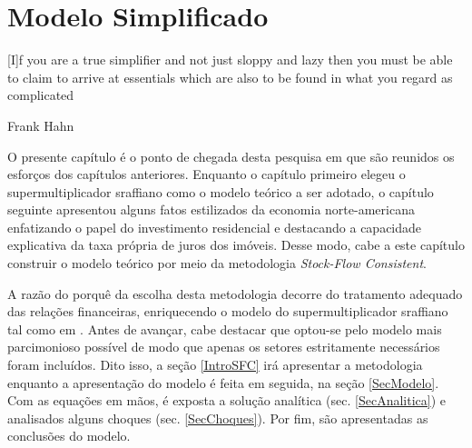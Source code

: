 
\chapter{Modelo Simplificado}\label{CapModelo}

\epigraph{[I]f you are a true simplifier and not just
sloppy and lazy then you must be able to claim to arrive at essentials which are also to be
found in what you regard as complicated}{Frank Hahn}

O presente capítulo é o ponto de chegada desta pesquisa em que são reunidos os esforços dos capítulos anteriores. Enquanto o capítulo primeiro elegeu o supermultiplicador sraffiano como o modelo teórico a ser adotado, o capítulo seguinte apresentou alguns fatos estilizados da economia norte-americana enfatizando o papel do investimento residencial e destacando a capacidade explicativa da taxa própria de juros dos imóveis. Desse modo, cabe a este capítulo construir o modelo teórico por meio da metodologia \textit{Stock-Flow Consistent}. 

A razão do porquê da escolha desta metodologia decorre do tratamento adequado das relações financeiras, enriquecendo o modelo do supermultiplicador sraffiano tal como em \cite{brochier_supermultiplier_2018}. Antes de avançar, cabe destacar que optou-se pelo modelo mais parcimonioso possível de modo que apenas os setores estritamente necessários foram incluídos.
Dito isso, a seção \ref{IntroSFC} irá apresentar a metodologia enquanto a apresentação do modelo é feita em seguida, na seção \ref{SecModelo}. Com as equações em mãos, é exposta a solução analítica (sec. \ref{SecAnalitica}) e analisados alguns choques (sec. \ref{SecChoques}).
Por fim, são apresentadas as conclusões do modelo.







